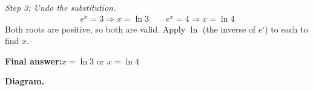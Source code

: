 \documentclass[11pt]{article}
\begin{document}
\textit{Step 3: Undo the substitution.}
\[\begin{gathered}
e^x = 3 \Rightarrow x = \ln 3 \qquad e^x = 4 \Rightarrow x = \ln 4
\end{gathered}\]
Both roots are positive, so both are valid. Apply \( \ln \) (the inverse of \( e^{\square} \)) to each to find \( x \).

\begin{answerbox}
\textbf{Final answer:}\quad \(\displaystyle  x = \ln 3 \) or \(\displaystyle  x = \ln 4 \)
\end{answerbox}
\textbf{Diagram.}

\begin{center}
\end{center}
\end{document}
